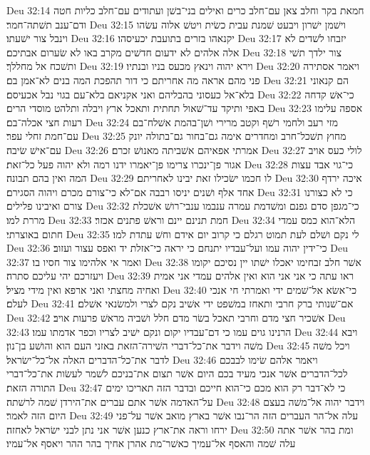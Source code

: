 Deu 32:14  חמאת בקר וחלב צאן עם־חלב כרים ואילים בני־בשׁן ועתודים עם־חלב כליות חטה ודם־ענב תשׁתה־חמר׃
Deu 32:15  וישׁמן ישׁרון ויבעט שׁמנת עבית כשׂית ויטשׁ אלוה עשׂהו וינבל צור ישׁעתו׃
Deu 32:16  יקנאהו בזרים בתועבת יכעיסהו׃
Deu 32:17  יזבחו לשׁדים לא אלה אלהים לא ידעום חדשׁים מקרב באו לא שׂערום אבתיכם׃
Deu 32:18  צור ילדך תשׁי ותשׁכח אל מחללך׃
Deu 32:19  וירא יהוה וינאץ מכעס בניו ובנתיו׃
Deu 32:20  ויאמר אסתירה פני מהם אראה מה אחריתם כי דור תהפכת המה בנים לא־אמן בם׃
Deu 32:21  הם קנאוני בלא־אל כעסוני בהבליהם ואני אקניאם בלא־עם בגוי נבל אכעיסם׃
Deu 32:22  כי־אשׁ קדחה באפי ותיקד עד־שׁאול תחתית ותאכל ארץ ויבלה ותלהט מוסדי הרים׃
Deu 32:23  אספה עלימו רעות חצי אכלה־בם׃
Deu 32:24  מזי רעב ולחמי רשׁף וקטב מרירי ושׁן־בהמת אשׁלח־בם עם־חמת זחלי עפר׃
Deu 32:25  מחוץ תשׁכל־חרב ומחדרים אימה גם־בחור גם־בתולה יונק עם־אישׁ שׂיבה׃
Deu 32:26  אמרתי אפאיהם אשׁביתה מאנושׁ זכרם׃
Deu 32:27  לולי כעס אויב אגור פן־ינכרו צרימו פן־יאמרו ידנו רמה ולא יהוה פעל כל־זאת׃
Deu 32:28  כי־גוי אבד עצות המה ואין בהם תבונה׃
Deu 32:29  לו חכמו ישׂכילו זאת יבינו לאחריתם׃
Deu 32:30  איכה ירדף אחד אלף ושׁנים יניסו רבבה אם־לא כי־צורם מכרם ויהוה הסגירם׃
Deu 32:31  כי לא כצורנו צורם ואיבינו פלילים׃
Deu 32:32  כי־מגפן סדם גפנם ומשׁדמת עמרה ענבמו ענבי־רושׁ אשׁכלת מררת למו׃
Deu 32:33  חמת תנינם יינם וראשׁ פתנים אכזר׃
Deu 32:34  הלא־הוא כמס עמדי חתום באוצרתי׃
Deu 32:35  לי נקם ושׁלם לעת תמוט רגלם כי קרוב יום אידם וחשׁ עתדת למו׃
Deu 32:36  כי־ידין יהוה עמו ועל־עבדיו יתנחם כי יראה כי־אזלת יד ואפס עצור ועזוב׃
Deu 32:37  ואמר אי אלהימו צור חסיו בו׃
Deu 32:38  אשׁר חלב זבחימו יאכלו ישׁתו יין נסיכם יקומו ויעזרכם יהי עליכם סתרה׃
Deu 32:39  ראו עתה כי אני אני הוא ואין אלהים עמדי אני אמית ואחיה מחצתי ואני ארפא ואין מידי מציל׃
Deu 32:40  כי־אשׂא אל־שׁמים ידי ואמרתי חי אנכי לעלם׃
Deu 32:41  אם־שׁנותי ברק חרבי ותאחז במשׁפט ידי אשׁיב נקם לצרי ולמשׂנאי אשׁלם׃
Deu 32:42  אשׁכיר חצי מדם וחרבי תאכל בשׂר מדם חלל ושׁביה מראשׁ פרעות אויב׃
Deu 32:43  הרנינו גוים עמו כי דם־עבדיו יקום ונקם ישׁיב לצריו וכפר אדמתו עמו׃
Deu 32:44  ויבא משׁה וידבר את־כל־דברי השׁירה־הזאת באזני העם הוא והושׁע בן־נון׃
Deu 32:45  ויכל משׁה לדבר את־כל־הדברים האלה אל־כל־ישׂראל׃
Deu 32:46  ויאמר אלהם שׂימו לבבכם לכל־הדברים אשׁר אנכי מעיד בכם היום אשׁר תצום את־בניכם לשׁמר לעשׂות את־כל־דברי התורה הזאת׃
Deu 32:47  כי לא־דבר רק הוא מכם כי־הוא חייכם ובדבר הזה תאריכו ימים על־האדמה אשׁר אתם עברים את־הירדן שׁמה לרשׁתה׃
Deu 32:48  וידבר יהוה אל־משׁה בעצם היום הזה לאמר׃
Deu 32:49  עלה אל־הר העברים הזה הר־נבו אשׁר בארץ מואב אשׁר על־פני ירחו וראה את־ארץ כנען אשׁר אני נתן לבני ישׂראל לאחזה׃
Deu 32:50  ומת בהר אשׁר אתה עלה שׁמה והאסף אל־עמיך כאשׁר־מת אהרן אחיך בהר ההר ויאסף אל־עמיו׃

